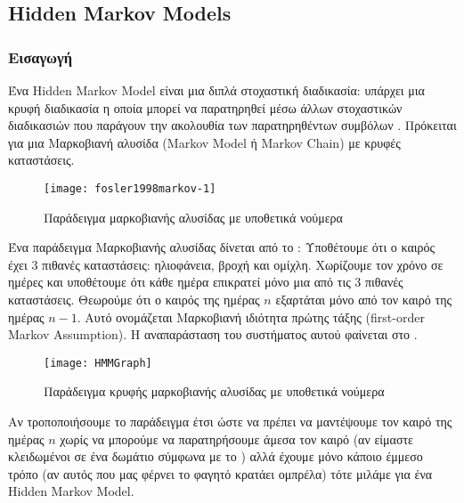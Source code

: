 \newcommand*{\hmm}{Hidden Markov Models}%
\subsection{\hmm{}}
\subsubsection{Εισαγωγή}
Ένα Hidden Markov Model είναι μια διπλά στοχαστική διαδικασία:
υπάρχει μια κρυφή διαδικασία η οποία μπορεί να παρατηρηθεί μέσω άλλων στοχαστικών διαδικασιών που παράγουν την ακολουθία των παρατηρηθέντων συμβόλων \cite{rabiner1986introduction}.
Πρόκειται για μια Μαρκοβιανή αλυσίδα (Markov Model ή Markov Chain) με κρυφές καταστάσεις.

\begin{wrapfigure}[15]{r}{0.5\textwidth}
        \centering
        \vspace{-20pt}\texttt{[image: fosler1998markov-1]}
        \vspace{-20pt}\caption{Παράδειγμα μαρκοβιανής αλυσίδας με υποθετικά νούμερα \protect\cite{fosler1998markov}}
        \label{fig:fosler1998markov-1}
\end{wrapfigure}

Ένα παράδειγμα Μαρκοβιανής αλυσίδας δίνεται από το \cite{fosler1998markov}:
Υποθέτουμε ότι ο καιρός έχει 3 πιθανές καταστάσεις: ηλιοφάνεια, βροχή και ομίχλη.
Χωρίζουμε τον χρόνο σε ημέρες και υποθέτουμε ότι κάθε ημέρα επικρατεί μόνο μια από τις 3 πιθανές καταστάσεις.
Θεωρούμε ότι ο καιρός της ημέρας $n$ εξαρτάται μόνο από τον καιρό της ημέρας $n-1$.
Αυτό ονομάζεται Μαρκοβιανή ιδιότητα πρώτης τάξης (first-order Markov Assumption).
Η αναπαράσταση του συστήματος αυτού φαίνεται στο .

\begin{wrapfigure}[15]{r}{0.5\textwidth}
        \centering
        \vspace{-20pt}\texttt{[image: HMMGraph]}
        \vspace{-20pt}\caption{Παράδειγμα κρυφής μαρκοβιανής αλυσίδας με υποθετικά νούμερα \protect\cite{wikiHMM}}
        \label{fig:HMMGraph}
\end{wrapfigure}

Αν τροποποιήσουμε το παράδειγμα έτσι ώστε να πρέπει να μαντέψουμε τον καιρό της ημέρας $n$ χωρίς να μπορούμε να παρατηρήσουμε άμεσα τον καιρό (αν είμαστε κλειδωμένοι σε ένα δωμάτιο σύμφωνα με το \cite{fosler1998markov})
αλλά έχουμε μόνο κάποιο έμμεσο τρόπο (αν αυτός που μας φέρνει το φαγητό κρατάει ομπρέλα) τότε μιλάμε για ένα Hidden Markov Model.


